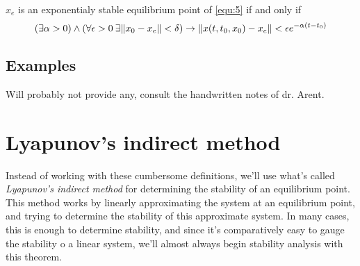 {

    $x_e$ is an exponentialy stable equilibrium point of  \ref{equ:5} if and only if \\
    \begin{equation}
        \label{dfn:estab_eq_pt}
        (\exists \alpha > 0 ) \wedge (\forall \epsilon > 0 \: \exists  \lVert x_0-x_e\rVert < \delta) \rightarrow \lVert x(t,t_0,x_0) - x_e\rVert < \epsilon e^{-\alpha(t-t_0)}
    \end{equation}
}
\subsection{Examples}
Will probably not provide any, consult the handwritten notes of dr. Arent.
\clearpage

\section{Lyapunov's indirect method}
Instead of working with these cumbersome definitions, we'll use what's called \textit{Lyapunov's indirect method} for determining the stability of an equilibrium point. This method works by linearly approximating the system at an equilibrium point, and trying to determine the stability of this approximate system. In many cases, this is enough to determine stability, and since it's comparatively easy to gauge the stability o a linear system, we'll almost always begin stability analysis with this theorem.
\thm{}

